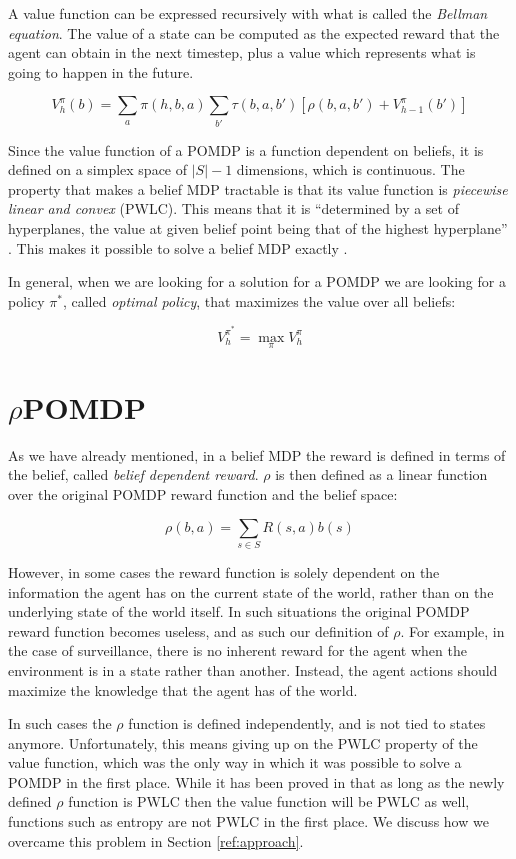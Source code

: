 A value function can be expressed recursively with what is called the \textit{Bellman equation}.
The value of a state can be computed as the expected reward that the agent can obtain in the
next timestep, plus a value which represents what is going to happen in the future.

\[ V^{\pi}_{h}(b) = \sum_a \pi(h, b, a) \sum_{b'} \tau(b, a, b') \left [ \rho(b, a, b') +
V^{\pi}_{h-1}(b') \right ] \]

Since the value function of a POMDP is a function dependent on beliefs, it is defined on a simplex
space of $|S|-1$ dimensions, which is continuous. The property that makes a belief MDP tractable is
that its value function is \textit{piecewise linear and convex} (PWLC). This means that it is
``determined by a set of hyperplanes, the value at given belief point being that of the highest
hyperplane'' \cite{cit:rpomdp}. This makes it possible to solve a belief MDP exactly
\cite{cit:pomdp}.

In general, when we are looking for a solution for a POMDP we are looking for a policy $\pi^*$, called
\textit{optimal policy}, that maximizes the value over all beliefs:

\[ V^{\pi^*}_h = \max_\pi V^{\pi}_h \]

\section{$\rho$POMDP}

As we have already mentioned, in a belief MDP the reward is defined in terms of the belief, called
\textit{belief dependent reward}. $\rho$ is then defined as a linear function over the original
POMDP reward function and the belief space:

\[ \rho(b,a) = \sum_{s\in S} R(s,a) b(s) \]

However, in some cases the reward function is solely dependent on the information the agent has on
the current state of the world, rather than on the underlying state of the world itself. In such
situations the original POMDP reward function becomes useless, and as such our definition of $\rho$.
For example, in the case of surveillance, there is no inherent reward for the agent when the
environment is in a state rather than another. Instead, the agent actions should maximize the
knowledge that the agent has of the world.

In such cases the $\rho$ function is defined independently, and is not tied to states anymore.
Unfortunately, this means giving up on the PWLC property of the value function, which was the only
way in which it was possible to solve a POMDP in the first place. While it has been proved in
\cite{cit:rpomdp} that as long as the newly defined $\rho$ function is PWLC then the value function
will be PWLC as well, functions such as entropy are not PWLC in the first place. We discuss how we
overcame this problem in Section \ref{ref:approach}.
